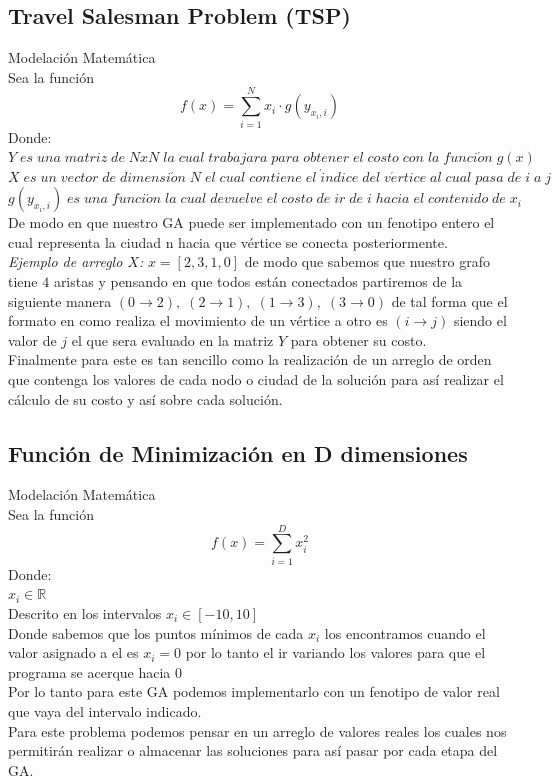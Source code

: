 \documentclass[10pt]{article}
\begin{document}
\subsection{Travel Salesman Problem (TSP)}
Modelación Matemática\\
Sea la función
\[f(x)=\sum_{i=1}^{N}x_{i} \cdot g\left(y_{x_{i},i}\right)\]
Donde:\\
\(\displaystyle Y\;es\;una\;matriz\;de\;NxN\;la\;cual\;trabajara\;para\;obtener\;el\;costo\;con\;la\;funci\acute{o}n\;g(x)\)\\\vspace{0.25cm}
\(\displaystyle X\;es\;un\;vector\;de\;dimensi\acute{o}n\;N\;el\;cual\;contiene\;el\;\acute{i}ndice\;del\;v\acute{e}rtice\;al\;cual\;pasa\;de\;i\;a\;j\)\\\vspace{0.25cm}
\(\displaystyle g(y_{x_{i},i})\;es\;una\;funci\acute{o}n\;la\;cual\;devuelve\;el\;costo\;de\;ir\;de\;i\;hacia\;el\;contenido\;de\;x_{i}\)\\\vspace{0.25cm}
De modo en que nuestro GA puede ser implementado con un fenotipo entero el cual representa la ciudad n hacia que vértice se conecta posteriormente.\\\vspace{0.25cm}
\textit{Ejemplo de arreglo $X$: }\(\displaystyle x=[2,3,1,0]\) de modo que sabemos que nuestro grafo tiene $4$ aristas y pensando en que todos están conectados partiremos de la siguiente manera $(0\rightarrow 2),\;(2\rightarrow 1),\;(1\rightarrow 3),\;(3\rightarrow 0)$ de tal forma que el formato en como realiza el movimiento de un vértice a otro es $(i\rightarrow j)$ siendo el valor de $j$ el que sera evaluado en la matriz $Y$ para obtener su costo.\\
Finalmente para este es tan sencillo como la realización de un arreglo de orden que contenga los valores de cada nodo o ciudad de la solución para así realizar el cálculo de su costo y así sobre cada solución.
\subsection{Función de Minimización en D dimensiones}
Modelación Matemática\\
Sea la función
\[f(x)=\sum_{i=1}^{D}x_{i}^{2}\]
Donde:\\
\(\displaystyle x_{i}\in\mathbb{R}\)\\\vspace{0.25cm}Descrito en los intervalos \(\displaystyle x_{i}\in[-10,10]\)\\\vspace{0.25cm}
Donde sabemos que los puntos mínimos de cada $x_{i}$ los encontramos cuando el valor asignado a el es $x_{i}=0$ por lo tanto el ir variando los valores para que el programa se acerque hacia $0$\\\vspace{0.25cm}
Por lo tanto para este GA podemos implementarlo con un fenotipo de valor real que vaya del intervalo indicado.\\
Para este problema podemos pensar en un arreglo de valores reales los cuales nos permitirán realizar o almacenar las soluciones para así pasar por cada etapa del GA.
\end{document}
